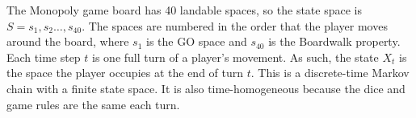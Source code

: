 The Monopoly game board has 40 landable spaces, so the state space is $S = s_1, s_2 \ldots, s_{40}$. The spaces are numbered in the order that the player moves around the board, where $s_1$ is the GO space and $s_{40}$ is the Boardwalk property. Each time step $t$ is one full turn of a player's movement. As such, the state $X_t$ is the space the player occupies at the end of turn $t$. This is a discrete-time Markov chain with a finite state space. It is also time-homogeneous because the dice and game rules are the same each turn. 